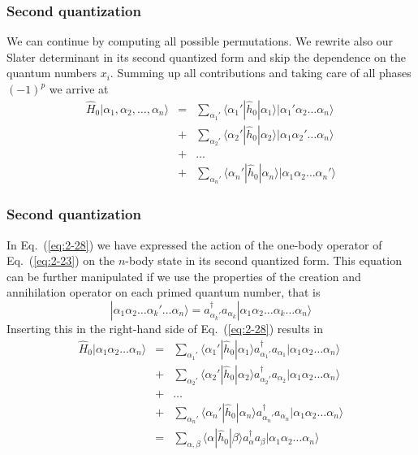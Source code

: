 \documentclass{beamer}
\begin{document}
\begin{frame}
\frametitle{Second quantization}

\begin{block}{}
We can continue by computing all possible permutations. 
We rewrite also our Slater determinant in its second quantized form and skip the dependence on the quantum numbers $x_i.$
Summing up all contributions and taking care of all phases
$(-1)^p$ we arrive at 
\begin{eqnarray}
	\hat{H}_0|\alpha_1,\alpha_2,\dots, \alpha_n\rangle &=& \sum_{\alpha_1'}\langle \alpha_1'|\hat{h}_0|\alpha_1\rangle
		|\alpha_1'\alpha_2 \dots \alpha_{n}\rangle \nonumber \\
	&+& \sum_{\alpha_2'} \langle \alpha_2'|\hat{h}_0|\alpha_2\rangle
		|\alpha_1\alpha_2' \dots \alpha_{n}\rangle \nonumber \\
	&+& \dots \nonumber \\
	&+& \sum_{\alpha_n'} \langle \alpha_n'|\hat{h}_0|\alpha_n\rangle
		|\alpha_1\alpha_2 \dots \alpha_{n}'\rangle \label{eq:2-28}
\end{eqnarray}
\end{block}
\end{frame}

\begin{frame}
\frametitle{Second quantization}

\begin{block}{}
In Eq.~(\ref{eq:2-28}) 
we have expressed the action of the one-body operator
of Eq.~(\ref{eq:2-23}) on the  $n$-body state in its second quantized form.
This equation can be further manipulated if we use the properties of the creation and annihilation operator
on each primed quantum number, that is
\begin{equation}
	|\alpha_1\alpha_2 \dots \alpha_k' \dots \alpha_{n}\rangle = 
		a_{\alpha_k'}^{\dagger}  a_{\alpha_k} |\alpha_1\alpha_2 \dots \alpha_k \dots \alpha_{n}\rangle \label{eq:2-29}
\end{equation}
Inserting this in the right-hand side of Eq.~(\ref{eq:2-28}) results in
\begin{eqnarray}
	\hat{H}_0|\alpha_1\alpha_2 \dots \alpha_{n}\rangle &=& \sum_{\alpha_1'}\langle \alpha_1'|\hat{h}_0|\alpha_1\rangle
		a_{\alpha_1'}^{\dagger}  a_{\alpha_1} |\alpha_1\alpha_2 \dots \alpha_{n}\rangle \nonumber \\
	&+& \sum_{\alpha_2'} \langle \alpha_2'|\hat{h}_0|\alpha_2\rangle
		a_{\alpha_2'}^{\dagger}  a_{\alpha_2} |\alpha_1\alpha_2 \dots \alpha_{n}\rangle \nonumber \\
	&+& \dots \nonumber \\
	&+& \sum_{\alpha_n'} \langle \alpha_n'|\hat{h}_0|\alpha_n\rangle
		a_{\alpha_n'}^{\dagger}  a_{\alpha_n} |\alpha_1\alpha_2 \dots \alpha_{n}\rangle \nonumber \\
	&=& \sum_{\alpha, \beta} \langle \alpha|\hat{h}_0|\beta\rangle a_\alpha^{\dagger} a_\beta 
		|\alpha_1\alpha_2 \dots \alpha_{n}\rangle \label{eq:2-30a}
\end{eqnarray}
\end{block}
\end{frame}
\end{document}
